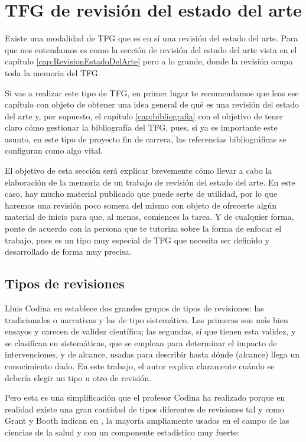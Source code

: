 \section{TFG de revisión del estado del arte}
\label{appendix:revisionestado}

Existe una modalidad de TFG que es en sí una revisión del estado del arte. Para que nos entendamos es como la sección de revisión del estado del arte vista en el capítulo \ref{cap:RevisionEstadoDelArte} pero a lo grande, donde la revisión ocupa toda la memoria del TFG.

Si vas a realizar este tipo de TFG, en primer lugar te recomendamos que leas ese capítulo con objeto de obtener una idea general de qué es una revisión del estado del arte y, por supuesto, el capítulo \ref{cap:bibliografia} con el objetivo de tener claro cómo gestionar la bibliografía del TFG, pues, si ya es importante este asunto, en este tipo de proyecto fin de carrera, las referencias bibliográficas se configuran como algo vital.

El objetivo de esta sección será explicar brevemente cómo llevar a cabo la elaboración de la memoria de un trabajo de revisión del estado del arte. En este caso, hay mucho material publicado que puede serte de utilidad, por lo que haremos una revisión poco somera del mismo con objeto de ofrecerte algún material de inicio para que, al menos, comiences la tarea. Y de cualquier forma, ponte de acuerdo con la persona que te tutoriza sobre la forma de enfocar el trabajo, pues es un tipo muy especial de TFG que necesita ser definido y desarrollado de forma muy precisa.

\subsection{Tipos de revisiones}

Lluis Codina en \cite{codina2024lluis} establece dos grandes grupos de tipos de revisiones: las tradicionales o narrativas y las de tipo sistemático. Las primeras son más bien ensayos y carecen de validez científica; las segundas, sí que tienen esta validez, y se clasifican en sistemáticas, que se emplean para determinar el impacto de intervenciones, y de alcance, usadas para describir hasta dónde (alcance) llega un conocimiento dado. En este trabajo, el autor explica claramente cuándo se debería elegir un tipo u otro de revisión.

Pero esta es una simplificación que el profesor Codina ha realizado porque en realidad existe una gran cantidad de tipos diferentes de revisiones tal y como Grant y Booth indican en \cite{grant2009maria}, la mayoría ampliamente usados en el campo de las ciencias de la salud y con un componente estadístico muy fuerte:

